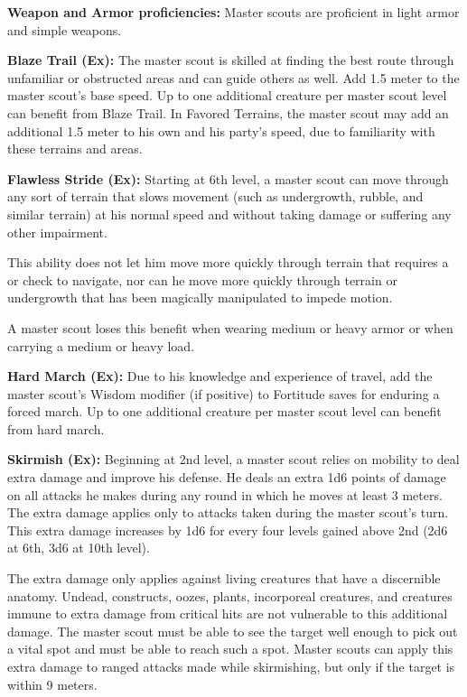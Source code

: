 {
\textbf{Weapon and Armor proficiencies:} Master scouts are proficient in light armor and simple weapons.

\textbf{Blaze Trail (Ex):} The master scout is skilled at finding the best route through unfamiliar or obstructed areas and can guide others as well. Add 1.5 meter to the master scout's base speed. Up to one additional creature per master scout level can benefit from Blaze Trail. In Favored Terrains, the master scout may add an additional 1.5 meter to his own and his party's speed, due to familiarity with these terrains and areas.


\textbf{Flawless Stride (Ex):} Starting at 6th level, a master scout can move through any sort of terrain that slows movement (such as undergrowth, rubble, and similar terrain) at his normal speed and without taking damage or suffering any other impairment.

This ability does not let him move more quickly through terrain that requires a  or  check to navigate, nor can he move more quickly through terrain or undergrowth that has been magically manipulated to impede motion.

A master scout loses this benefit when wearing medium or heavy armor or when carrying a medium or heavy load.

\textbf{Hard March (Ex):} Due to his knowledge and experience of travel, add the master scout's Wisdom modifier (if positive) to Fortitude saves for enduring a forced march. Up to one additional creature per master scout level can benefit from hard march.

\textbf{Skirmish (Ex):} Beginning at 2nd level, a master scout relies on mobility to deal extra damage and improve his defense. He deals an extra 1d6 points of damage on all attacks he makes during any round in which he moves at least 3 meters. The extra damage applies only to attacks taken during the master scout's turn. This extra damage increases by 1d6 for every four levels gained above 2nd (2d6 at 6th, 3d6 at 10th level).

The extra damage only applies against living creatures that have a discernible anatomy. Undead, constructs, oozes, plants, incorporeal creatures, and creatures immune to extra damage from critical hits are not vulnerable to this additional damage. The master scout must be able to see the target well enough to pick out a vital spot and must be able to reach such a spot. Master scouts can apply this extra damage to ranged attacks made while skirmishing, but only if the target is within 9 meters.

}
